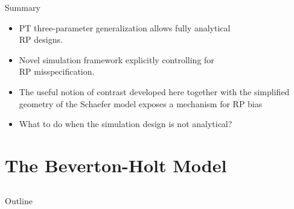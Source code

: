\documentclass[ xcolor = pdftex, dvipsnames, table ]{beamer}
\begin{document}
%
\begin{frame}{Summary}
\begin{itemize}
\setlength\itemsep{1em}
	\item PT three-parameter generalization allows fully analytical \\RP designs.
	\item Novel simulation framework explicitly controlling for \\RP misspecification. %
	\item The useful notion of contrast developed here together with the simplified geometry of the 
	Schaefer model exposes a mechanism for RP bias
	\item What to do when the simulation design is not analytical?
\end{itemize}
\end{frame}

%
\section{The Beverton-Holt Model}
\subsection{}
\begin{frame}{Outline}
\end{frame}
\end{document}
